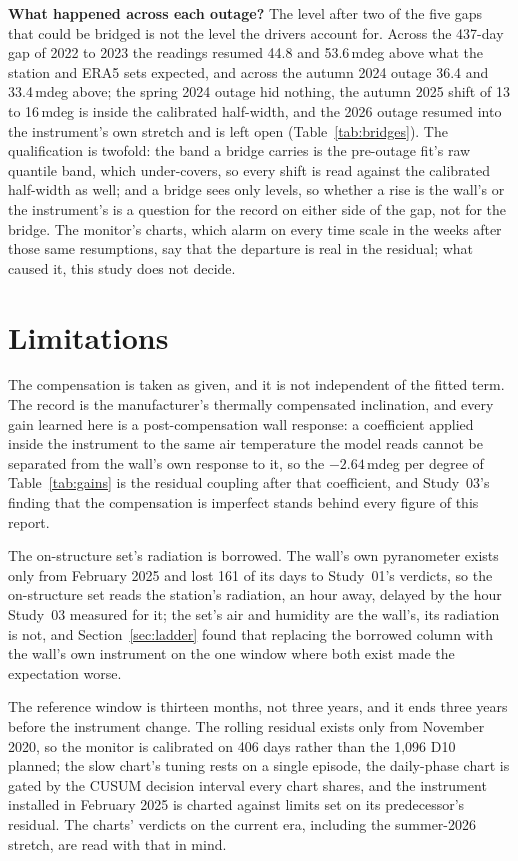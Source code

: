 \documentclass[11pt,a4paper]{article}
\begin{document}
\textbf{What happened across each outage?} The level after two of the five
gaps that could be bridged is not the level the drivers account for. Across
the 437-day gap of 2022 to 2023 the readings resumed 44.8 and 53.6\,mdeg
above what the station and ERA5 sets expected, and across the autumn 2024
outage 36.4 and 33.4\,mdeg above; the spring 2024 outage hid nothing, the
autumn 2025 shift of 13 to 16\,mdeg is inside the calibrated half-width, and
the 2026 outage resumed into the instrument's own stretch and is left open
(Table~\ref{tab:bridges}). The qualification is twofold: the band a bridge
carries is the pre-outage fit's raw quantile band, which under-covers, so
every shift is read against the calibrated half-width as well; and a bridge
sees only levels, so whether a rise is the wall's or the instrument's is a
question for the record on either side of the gap, not for the bridge. The
monitor's charts, which alarm on every time scale in the weeks after those
same resumptions, say that the departure is real in the residual; what
caused it, this study does not decide.

\section{Limitations}
\label{sec:limitations}

The compensation is taken as given, and it is not independent of the fitted
term. The record is the manufacturer's thermally compensated inclination,
and every gain learned here is a post-compensation wall response: a
coefficient applied inside the instrument to the same air temperature the
model reads cannot be separated from the wall's own response to it, so the
$-2.64$\,mdeg per degree of Table~\ref{tab:gains} is the residual coupling
after that coefficient, and Study~03's finding that the compensation is
imperfect stands behind every figure of this report.

The on-structure set's radiation is borrowed. The wall's own pyranometer
exists only from February 2025 and lost 161 of its days to Study~01's
verdicts, so the on-structure set reads the station's radiation, an hour
away, delayed by the hour Study~03 measured for it; the set's air and
humidity are the wall's, its radiation is not, and Section~\ref{sec:ladder}
found that replacing the borrowed column with the wall's own instrument on
the one window where both exist made the expectation worse.

The reference window is thirteen months, not three years, and it ends three
years before the instrument change. The rolling residual exists only from
November 2020, so the monitor is calibrated on 406 days rather than the
1,096 D10 planned; the slow chart's tuning rests on a single episode, the
daily-phase chart is gated by the CUSUM decision interval every chart
shares, and the instrument installed in February 2025 is charted against
limits set on its predecessor's residual. The charts' verdicts on the
current era, including the summer-2026 stretch, are read with that in mind.
\end{document}
